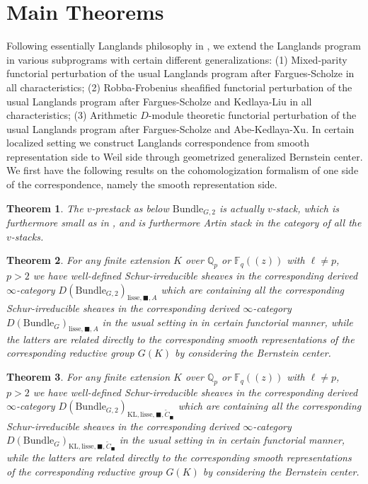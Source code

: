 \documentclass[12pt]{book}
\newtheorem{theorem}{Theorem}
\theoremstyle{definition}
\begin{document}
\newpage
\section{Main Theorems}

Following essentially Langlands philosophy in \cite{La}, we extend the Langlands program in various subprograms with certain different generalizations: (1) Mixed-parity functorial perturbation of the usual Langlands program after Fargues-Scholze in all characteristics; (2) Robba-Frobenius sheafified functorial perturbation of the usual Langlands program after Fargues-Scholze and Kedlaya-Liu in all characteristics; (3) Arithmetic $D$-module theoretic functorial perturbation of the usual Langlands program after Fargues-Scholze and Abe-Kedlaya-Xu. In certain localized setting we construct Langlands correspondence from smooth representation side to Weil side through geometrized generalized Bernstein center. We first have the following results on the cohomologization formalism of one side of the correspondence, namely the smooth representation side.


\begin{theorem}
The $v$-prestack as below $\mathrm{Bundle}_{G,2}$ is actually $v$-stack, which is furthermore small as in \cite{FS}, and is furthermore Artin stack in the category of all the $v$-stacks.
\end{theorem}

\begin{theorem}
For any finite extension $K$ over $\mathbb{Q}_p$ or $\mathbb{F}_q((z))$ with $\ell\neq p$, $p>2$ we have well-defined Schur-irreducible sheaves in the corresponding derived $\infty$-category $D(\mathrm{Bundle}_{G,2})_{\text{lisse},\blacksquare,A}$ which are containing all the corresponding Schur-irreducible sheaves in the corresponding derived $\infty$-category $D(\mathrm{Bundle}_{G})_{\text{lisse},\blacksquare,A}$ in the usual setting in \cite{FS} in certain functorial manner, while the latters are related directly to the corresponding smooth representations of the corresponding reductive group $G(K)$ by considering the Bernstein center.
\end{theorem}

\begin{theorem}
For any finite extension $K$ over $\mathbb{Q}_p$ or $\mathbb{F}_q((z))$ with $\ell\neq p$, $p>2$ we have well-defined Schur-irreducible sheaves in the corresponding derived $\infty$-category $D(\mathrm{Bundle}_{G,2})_{\text{KL},\mathrm{lisse},\blacksquare,\widetilde{C}_\blacksquare}$ which are containing all the corresponding Schur-irreducible sheaves in the corresponding derived $\infty$-category $D(\mathrm{Bundle}_{G})_{\text{KL},\mathrm{lisse},\blacksquare,\widetilde{C}_\blacksquare}$ in the usual setting in \cite{FS} in certain functorial manner, while the latters are related directly to the corresponding smooth representations of the corresponding reductive group $G(K)$ by considering the Bernstein center.
\end{theorem}
\end{document}
